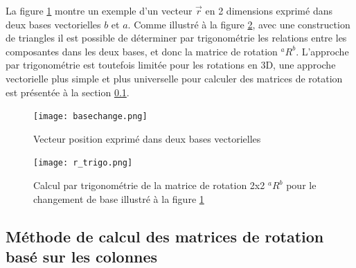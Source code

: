 La figure \ref{fig:basechange2d} montre un exemple d'un vecteur $\vec{r}$ en 2 dimensions exprimé dans deux bases vectorielles $b$ et $a$. Comme illustré à la figure \ref{fig:r_trigo}, avec une construction de triangles il est possible de déterminer par trigonométrie les relations entre les composantes dans les deux bases, et donc la matrice de rotation ${}^aR^b$. L'approche par trigonométrie est toutefois limitée pour les rotations en 3D, une approche vectorielle plus simple et plus universelle pour calculer des matrices de rotation est présentée à la section \ref{sec:calmat}.
\begin{figure}[H]
	\centering
	\texttt{[image: basechange.png]}
	\caption{Vecteur position exprimé dans deux bases vectorielles}
	\label{fig:basechange2d}
\end{figure}
\begin{figure}[H]
	\centering
	\texttt{[image: r\_trigo.png]}
	\caption{Calcul par trigonométrie de la matrice de rotation 2x2 ${}^aR^b$ pour le changement de base illustré à la figure \ref{fig:basechange2d}}
	\label{fig:r_trigo}
\end{figure}




\subsection{Méthode de calcul des matrices de rotation basé sur les colonnes}
\label{sec:calmat}

